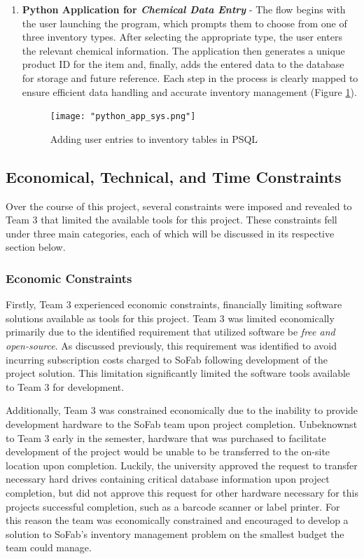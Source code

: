 \documentclass{article}
\begin{document}
\begin{enumerate}
    \item \textbf{Python Application for \textit{Chemical Data Entry}} - The flow begins with the user launching the program, which 
        prompts them to choose from one of three inventory types. After selecting the appropriate type, the user enters the 
        relevant chemical information. The application then generates a unique product ID for the item and, finally, adds the 
        entered data to the database for storage and future reference. Each step in the process is clearly mapped to ensure 
        efficient data handling and accurate inventory management (Figure \ref{fig:appsysdiagram}).  

    \begin{figure}[h!] 
         \centering 
         \texttt{[image: "python\_app\_sys.png"]} 
         \caption{Adding user entries to inventory tables in PSQL} 
         \label{fig:appsysdiagram} 
     \end{figure} 
\end{enumerate} 

\subsection{Economical, Technical, and Time Constraints}
Over the course of this project, several constraints were imposed and revealed to Team 3 that limited the available tools for this 
project. These constraints fell under three main categories, each of which will be discussed in its respective section below. 
\subsubsection{Economic Constraints}
Firstly, Team 3 experienced economic constraints, financially limiting software solutions available as tools for this project. Team 3 
was limited economically primarily due to the identified requirement that utilized software be \textit{free and open-source}. As 
discussed previously, this requirement was identified to avoid incurring subscription costs charged to SoFab following development of 
the project solution. This limitation significantly limited the software tools available to Team 3 for development. 

Additionally, Team 3 was constrained economically due to the inability to provide development hardware to the SoFab team upon project
completion. Unbeknownst to Team 3 early in the semester, hardware that was purchased to facilitate development of the project would be 
unable to be transferred to the on-site location upon completion. Luckily, the university approved the request to transfer necessary 
hard drives containing critical database information upon project completion, but did not approve this request for other hardware 
necessary for this projects successful completion, such as a barcode scanner or label printer. For this reason the team was economically 
constrained and encouraged to develop a solution to SoFab's inventory management problem on the smallest budget the team could manage. 
\end{document}
